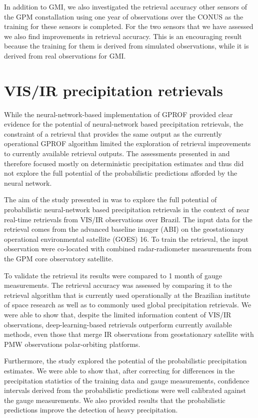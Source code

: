 {In addition to GMI, we also investigated the retrieval accuracy other sensors of
the GPM constallation using one year of observations over the CONUS as the
training for these sensors is completed. For the two sensors that we have
assessed we also find improvements in retrieval accuracy. This is an encouraging
result because the training for them is derived from simulated observations,
while it is derived from real observations for GMI.


\section{VIS/IR precipitation retrievals}

While the neural-network-based implementation of GPROF provided clear evidence
for the potential of neural-network based precipitation retrievals, the
constraint of a retrieval that provides the same output as the currently
operational GPROF algorithm limited the exploration of retrieval improvements to
currently available retrieval outputs. The assessments presented in
\citet{pfreundschuh22} and \citet{pfreundschuh22c} therefore focused mostly on
deterministic precipitation estimates and thus did not explore the full
potential of the probabilistic predictions afforded by the neural network.

The aim of the study presented in \citet{pfreundschuh22b} was to explore the
full potential of probabilistic neural-network based precipitation retrievals in
the context of near real-time retrievals from VIS/IR observations over Brazil.
The input data for the retrieval comes from the advanced baseline imager (ABI)
on the geostationary operational environmental satellite (GOES) 16. To train the
retrieval, the input observation were co-located with combined radar-radiometer
measurements from the GPM core observatory satellite.

To validate the retrieval its results were compared to 1 month of gauge
measurements. The retrieval accuracy was assessed by comparing it to the
retrieval algorithm that is currently used operationally at the Brazilian
institute of space research as well as to commonly used global precipitation
retrievals. We were able to show that, despite the limited information content
of VIS/IR observations, deep-learning-based retrievals outperform currently
available methods, even those that merge IR observations from geostationary
satellite with PMW observations polar-orbiting platforms.

Furthermore, the study explored the potential of the probabilistic precipitation
estimates. We were able to show that, after correcting for differences in the
precipitation statistics of the training data and gauge measurements, confidence
intervals derived from the probabilistic predictions were well calibrated
against the gauge measurements. We also provided results that the probabilistic
predictions improve the detection of heavy precipitation.


}
